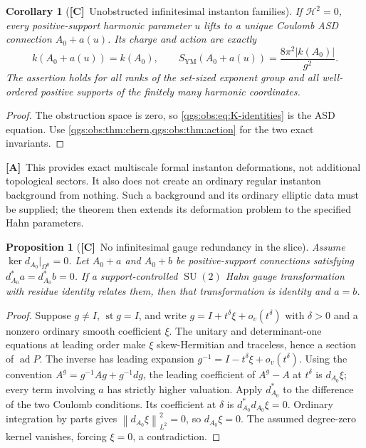 \documentclass[11pt,oneside]{article}
\numberwithin{equation}{section}
\theoremstyle{plain}
\newtheorem{proposition}[proposition]{Proposition}
\newtheorem{corollary}[corollary]{Corollary}
\theoremstyle{definition}
\theoremstyle{remark}
\newcommand{\SYM}{S_{\mathrm{YM}}}
\DeclareMathOperator{\st}{st}
\DeclareMathOperator{\SU}{SU}
\DeclareMathOperator{\ad}{ad}
\newcommand{\abs}[1]{\left|#1\right|}
\newcommand{\norm}[1]{\left\|#1\right\|}
\newcommand{\TC}{\textcolor{TierC}{\textsf{\bfseries[C]}}}
\newcommand{\TA}{\textcolor{TierA}{\textsf{\bfseries[A]}}}
\begin{document}
\begin{corollary}[\TC\ Unobstructed infinitesimal instanton families]\label{qgs:obs:cor:regular}
If $\mathcal H^2=0$, every positive-support harmonic parameter $u$ lifts to a unique Coulomb ASD connection $A_0+a(u)$. Its charge and action are exactly
\begin{equation}
 k(A_0+a(u))=k(A_0),\qquad
 \SYM(A_0+a(u))=\frac{8\pi^2\abs{k(A_0)}}{g^2}.
\end{equation}
The assertion holds for all ranks of the set-sized exponent group and all well-ordered positive supports of the finitely many harmonic coordinates.
\end{corollary}
\begin{proof}
The obstruction space is zero, so \eqref{qgs:obs:eq:K-identities} is the ASD equation. Use \cref{qgs:obs:thm:chern,qgs:obs:thm:action} for the two exact invariants.
\end{proof}

\TA\ This provides exact multiscale formal instanton deformations, not additional topological sectors. It also does not create an ordinary regular instanton background from nothing. Such a background and its ordinary elliptic data must be supplied; the theorem then extends its deformation problem to the specified Hahn parameters.

\begin{proposition}[\TC\ No infinitesimal gauge redundancy in the slice]\label{qgs:obs:prop:slice}
Assume $\ker d_{A_0}|_{\Omega^0}=0$. Let $A_0+a$ and $A_0+b$ be positive-support connections satisfying $d_{A_0}^*a=d_{A_0}^*b=0$. If a support-controlled $\SU(2)$ Hahn gauge transformation with residue identity relates them, then that transformation is identity and $a=b$.
\end{proposition}
\begin{proof}
Suppose $g\ne I$, $\st g=I$, and write $g=I+t^\delta\xi+o_v(t^\delta)$ with $\delta>0$ and a nonzero ordinary smooth coefficient $\xi$. The unitary and determinant-one equations at leading order make $\xi$ skew-Hermitian and traceless, hence a section of $\ad P$. The inverse has leading expansion $g^{-1}=I-t^\delta\xi+o_v(t^\delta)$. Using the convention $A^g=g^{-1}Ag+g^{-1}dg$, the leading coefficient of $A^g-A$ at $t^\delta$ is $d_{A_0}\xi$; every term involving $a$ has strictly higher valuation. Apply $d_{A_0}^*$ to the difference of the two Coulomb conditions. Its coefficient at $\delta$ is $d_{A_0}^*d_{A_0}\xi=0$. Ordinary integration by parts gives $\norm{d_{A_0}\xi}_{L^2}^2=0$, so $d_{A_0}\xi=0$. The assumed degree-zero kernel vanishes, forcing $\xi=0$, a contradiction.
\end{proof}
\end{document}
